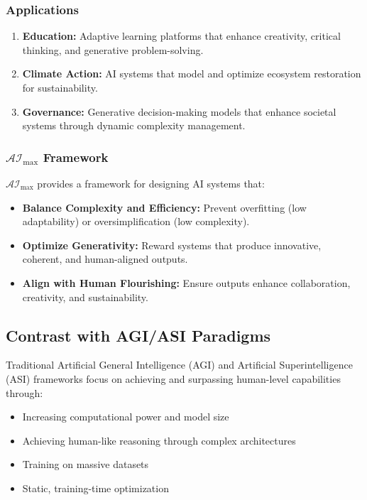 \documentclass[12pt]{article}
\begin{document}
\subsubsection{Applications}
\begin{enumerate}
    \item \textbf{Education:} Adaptive learning platforms that enhance creativity, critical thinking, and generative problem-solving.
    \item \textbf{Climate Action:} AI systems that model and optimize ecosystem restoration for sustainability.
    \item \textbf{Governance:} Generative decision-making models that enhance societal systems through dynamic complexity management.
\end{enumerate}

\subsubsection{\( \mathcal{AI}_{\text{max}} \) Framework}
\( \mathcal{AI}_{\text{max}} \) provides a framework for designing AI systems that:
\begin{itemize}
    \item \textbf{Balance Complexity and Efficiency:} Prevent overfitting (low adaptability) or oversimplification (low complexity).
    \item \textbf{Optimize Generativity:} Reward systems that produce innovative, coherent, and human-aligned outputs.
    \item \textbf{Align with Human Flourishing:} Ensure outputs enhance collaboration, creativity, and sustainability.
\end{itemize}

\subsection{Contrast with AGI/ASI Paradigms}

Traditional Artificial General Intelligence (AGI) and Artificial Superintelligence (ASI) frameworks focus on achieving and surpassing human-level capabilities through:
\begin{itemize}
    \item Increasing computational power and model size
    \item Achieving human-like reasoning through complex architectures
    \item Training on massive datasets
    \item Static, training-time optimization
\end{itemize}
\end{document}
